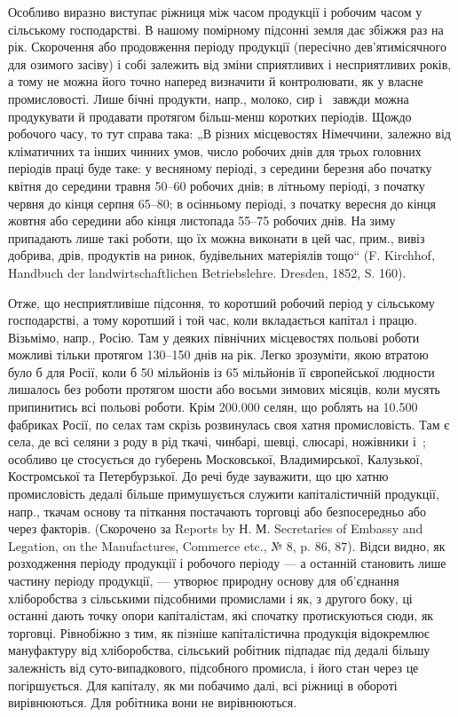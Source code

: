 Особливо виразно виступає ріжниця між часом продукції і робочим
часом у сільському господарстві. В нашому помірному підсонні земля дає
збіжжя раз на рік. Скорочення або продовження періоду продукції (пересічно
дев’ятимісячного для озимого засіву) і собі залежить від зміни
сприятливих і несприятливих років, а тому не можна його точно наперед
визначити й контролювати, як у власне промисловості. Лише бічні продукти,
напр., молоко, сир і~ завжди можна продукувати й продавати
протягом більш-менш коротких періодів. Щождо робочого часу, то тут
справа така: „В різних місцевостях Німеччини, залежно від кліматичних
та інших чинних умов, число робочих днів для трьох головних періодів
праці буде таке: у весняному періоді, з середини березня або початку
квітня до середини травня 50--60 робочих днів; в літньому періоді, з початку
червня до кінця серпня 65--80; в осінньому періоді, з початку
вересня до кінця жовтня або середини або кінця листопада 55--75 робочих
днів. На зиму припадають лише такі роботи, що їх можна виконати
в цей час, прим., вивіз добрива, дрів, продуктів на ринок, будівельних
матеріялів тощо“ (F. Kirchhof, Handbuch der landwirtschaftlichen
Betriebslehre. Dresden, 1852, S. 160).

Отже, що несприятливіше підсоння, то коротший робочий період у
сільському господарстві, а тому коротший і той час, коли вкладається
капітал і працю. Візьмімо, напр., Росію. Там у деяких північних місцевостях
польові роботи можливі тільки протягом 130--150 днів на рік.
Легко зрозуміти, якою втратою було б для Росії, коли б 50 мільйонів
із 65 мільйонів її європейської людности лишалось без роботи протягом
шости або восьми зимових місяців, коли мусять припинитись всі польові
роботи. Крім \num{200.000} селян, що роблять на \num{10.500} фабриках Росії, по
селах там скрізь розвинулась своя хатня промисловість. Там є села, де
всі селяни з роду в рід ткачі, чинбарі, шевці, слюсарі, ножівники і~; особливо це стосується до губерень Московської, Владимирської, Калузької,
Костромської та Петербурзької. До речі буде зауважити, що цю
хатню промисловість дедалі більше примушується служити капіталістичній
продукції, напр., ткачам основу та піткання постачають торговці або
безпосередньо або через факторів. (Скорочено за Reports by Н. М. Secretaries
of Embassy and Legation, on the Manufactures, Commerce etc.,
№ 8, p. 86, 87). Відси видно, як розходження періоду продукції і робочого
періоду — а останній становить лише частину періоду продукції, —
утворює природну основу для об’єднання хліборобства з сільськими підсобними
промислами і як, з другого боку, ці останні дають точку опори
капіталістам, які спочатку протискуються сюди, як торговці. Рівнобіжно
з тим, як пізніше капіталістична продукція відокремлює мануфактуру від
хліборобства, сільський робітник підпадає під дедалі більшу залежність
від суто-випадкового, підсобного промисла, і його стан через це погіршується.
Для капіталу, як ми побачимо далі, всі ріжниці в обороті вирівнюються.
Для робітника вони не вирівнюються.

